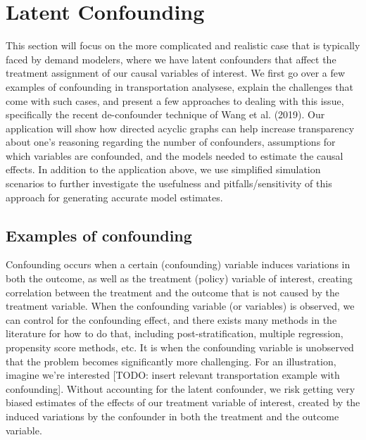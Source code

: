 \section{Latent Confounding}

This section will focus on the more complicated and realistic case that is 
typically faced by demand modelers, where we have latent confounders that 
affect the treatment assignment of our causal variables of interest. We first
 go over a few examples of confounding in transportation analysese, explain 
 the challenges that come with such cases, and present a few approaches to 
 dealing with this issue, specifically the recent de-confounder technique of 
 Wang et al. (2019). Our application will show how directed acyclic graphs can 
 help increase transparency about one's reasoning regarding the number of 
 confounders, assumptions for which variables are confounded, and the models 
 needed to estimate the causal effects. In addition to the application above, 
 we use simplified simulation scenarios to further investigate the usefulness 
 and pitfalls/sensitivity of this approach for generating accurate model 
 estimates. 


\subsection{Examples of confounding}


Confounding occurs when a certain (confounding) variable induces variations in
 both the outcome, as well as the treatment (policy) variable of interest, 
 creating correlation between the treatment and the outcome that is not caused
  by the treatment variable. When the confounding variable (or variables) is 
  observed, we can control for the confounding effect, and there exists many 
  methods in the literature for how to do that, including post-stratification,
   multiple regression, propensity score methods, etc. It is when the 
   confounding variable is unobserved that the problem becomes significantly 
   more challenging. For an illustration, imagine we're interested [TODO: 
   insert relevant transportation example with confounding]. Without 
   accounting for the latent confounder, we risk getting very biased estimates 
   of the effects of our treatment variable of interest, created by the 
   induced variations by the confounder in both the treatment and the outcome 
   variable. 



